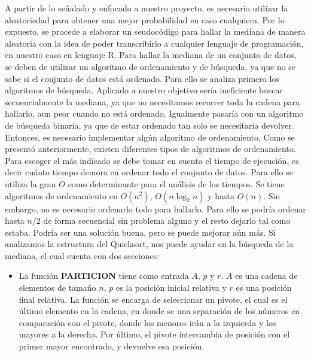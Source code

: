 \documentclass[final,a4paper,romanappendices]{IEEEtran}\usepackage[]{graphicx}\usepackage[]{color}
\theoremstyle{definition}
\begin{document}
A partir de lo señalado y enfocado a nuestro proyecto, es necesario utilizar la aleatoriedad para obtener una mejor probabilidad en caso cualquiera. Por lo expuesto, se procede a elaborar un seudocódigo para hallar la mediana de manera aleatoria con la idea de poder transcribirlo a cualquier lenguaje de programación, en nuestro caso en lenguaje R. Para hallar la mediana de un conjunto de datos, se deben de utilizar un algoritmo de ordenamiento y de búsqueda, ya que no se sabe si el conjunto de datos está ordenado. Para ello se analiza primero los algoritmos de búsqueda.
\newline
Aplicado a nuestro objetivo sería ineficiente buscar secuencialmente la mediana, ya que no necesitamos recorrer toda la cadena para hallarlo, aun peor cuando no está ordenado. Igualmente pasaría con un algoritmo de búsqueda binaria, ya que de estar ordenado tan solo se necesitaría devolver. Entonces, es necesario implementar algún algoritmo de ordenamiento.
\newline
Como se presentó anteriormente, existen diferentes tipos de algoritmos de ordenamiento. Para escoger el más indicado se debe tomar en cuenta el tiempo de ejecución, es decir cuánto tiempo demora en ordenar todo el conjunto de datos. Para ello se utiliza la gran $O$ como determinante para el análisis de los tiempos. Se tiene algoritmos de ordenamiento en $O(n^2)$, $O(n\log_{2}n)$ y hasta $O(n)$.
\newline
Sin embargo, no es necesario ordenarlo todo para hallarlo. Para ello se podría ordenar hasta $n/2$ de forma secuencial sin problema alguno y el resto dejarlo tal como estaba. Podría ser una solución buena, pero se puede mejorar aún más. Si analizamos la estructura del Quicksort, nos puede ayudar en la búsqueda de la mediana, el cual cuenta con dos secciones:
\newline
\begin{itemize}
	\item La función {\bf{PARTICION}} tiene como entrada $A$, $p$ y $r$. $A$ es una cadena de elementos de tamaño $n$, $p$ es la posición inicial relativa y $r$ es una posición final relativa. La función se encarga de seleccionar un pivote, el cual es el último elemento en la cadena, en donde se una separación de los números en comparación con el pivote, donde los menores irán a la izquierda y los mayores a la derecha. Por último, el pivote intercambia de posición con el primer mayor encontrado, y devuelve esa posición.

\end{itemize}
\end{document}
